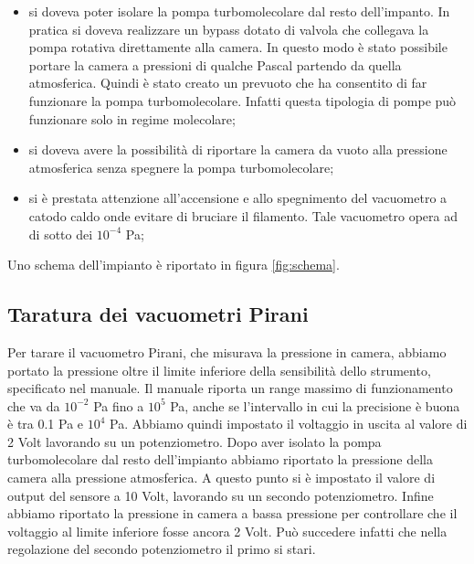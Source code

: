 \begin{itemize}
	\item{si doveva poter isolare la pompa turbomolecolare dal resto dell'impanto. In pratica si doveva realizzare un bypass dotato di valvola che collegava la pompa rotativa direttamente alla camera. In questo modo è stato possibile portare la camera a pressioni di qualche Pascal partendo da quella atmosferica. Quindi è stato creato un prevuoto che ha consentito di far funzionare la pompa turbomolecolare. Infatti questa tipologia di pompe può funzionare solo in regime molecolare;} %
	\item{si doveva avere la possibilità di riportare la camera da vuoto alla pressione atmosferica senza spegnere
    la pompa turbomolecolare;}
    \item{si è prestata attenzione all'accensione e allo spegnimento del vacuometro a catodo caldo onde evitare
    di bruciare il filamento. Tale vacuometro opera ad di sotto dei $10^{-4}$ \si{\pascal};}
\end{itemize}

Uno schema dell'impianto è riportato in figura \ref{fig:schema}.

\subsection{Taratura dei vacuometri Pirani}

Per tarare il vacuometro Pirani, che misurava la pressione in camera, abbiamo portato la pressione oltre il limite inferiore
della sensibilità dello strumento, specificato nel manuale. Il manuale riporta un range massimo di funzionamento che va da $10^{-2}$ \si{\pascal} fino a $10^5$ \si{\pascal}, anche se l'intervallo in cui la precisione è buona è tra 0.1 \si{\pascal} e $10^4$ \si{\pascal}. Abbiamo quindi impostato il voltaggio in uscita al valore di 2 Volt lavorando su un potenziometro. Dopo aver isolato la pompa turbomolecolare dal resto dell'impianto abbiamo riportato la pressione della camera alla pressione atmosferica. A questo punto si è impostato il valore di output del sensore a 10 Volt, lavorando su un secondo potenziometro. Infine abbiamo riportato la pressione in camera a bassa pressione per controllare che il voltaggio al limite inferiore fosse ancora 2 Volt. Può succedere infatti che nella regolazione del secondo potenziometro il primo si stari.

